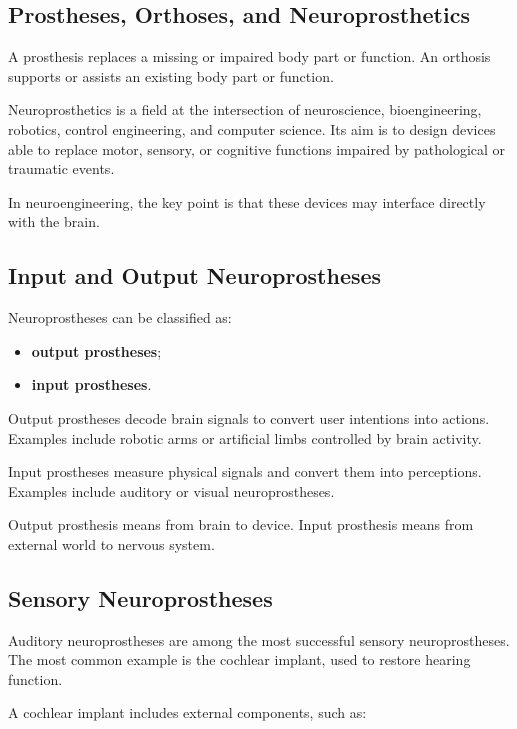 \subsection{Prostheses, Orthoses, and Neuroprosthetics}

A prosthesis replaces a missing or impaired body part or function. An orthosis supports or assists an existing body part or function.

Neuroprosthetics is a field at the intersection of neuroscience, bioengineering, robotics, control engineering, and computer science. Its aim is to design devices able to replace motor, sensory, or cognitive functions impaired by pathological or traumatic events.

In neuroengineering, the key point is that these devices may interface directly with the brain.

\subsection{Input and Output Neuroprostheses}

Neuroprostheses can be classified as:

\begin{itemize}[noitemsep]
    \item \textbf{output prostheses};
    \item \textbf{input prostheses}.
\end{itemize}

Output prostheses decode brain signals to convert user intentions into actions. Examples include robotic arms or artificial limbs controlled by brain activity.

Input prostheses measure physical signals and convert them into perceptions. Examples include auditory or visual neuroprostheses.

\begin{authornote}
Output prosthesis means from brain to device. Input prosthesis means from external world to nervous system.
\end{authornote}

\subsection{Sensory Neuroprostheses}

Auditory neuroprostheses are among the most successful sensory neuroprostheses. The most common example is the cochlear implant, used to restore hearing function.

A cochlear implant includes external components, such as:

